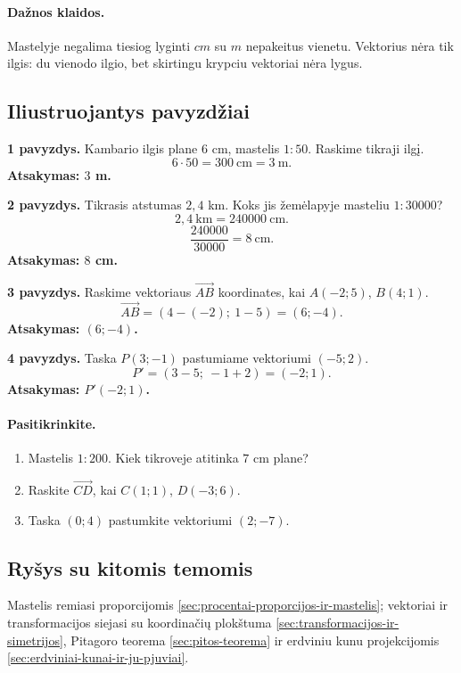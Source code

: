 \paragraph{Dažnos klaidos.}
Mastelyje negalima tiesiog lyginti $cm$ su $m$ nepakeitus vienetu. Vektorius nėra tik ilgis: du vienodo ilgio, bet skirtingu krypciu vektoriai nėra lygus.

\subsection{Iliustruojantys pavyzdžiai}
\textbf{1 pavyzdys.} Kambario ilgis plane $6$ cm, mastelis $1:50$. Raskime tikraji ilgį.
\[
6\cdot50=300\ \text{cm}=3\ \text{m}.
\]
\textbf{Atsakymas: $3$ m.}

\textbf{2 pavyzdys.} Tikrasis atstumas $2{,}4$ km. Koks jis žemėlapyje masteliu $1:30000$?
\[
2{,}4\ \text{km}=240000\ \text{cm}.
\]
\[
\frac{240000}{30000}=8\ \text{cm}.
\]
\textbf{Atsakymas: $8$ cm.}

\textbf{3 pavyzdys.} Raskime vektoriaus $\overrightarrow{AB}$ koordinates, kai $A(-2;5)$, $B(4;1)$.
\[
\overrightarrow{AB}=(4-(-2);\ 1-5)=(6;-4).
\]
\textbf{Atsakymas: $(6;-4)$.}

\textbf{4 pavyzdys.} Taska $P(3;-1)$ pastumiame vektoriumi $(-5;2)$.
\[
P'=(3-5;\ -1+2)=(-2;1).
\]
\textbf{Atsakymas: $P'(-2;1)$.}

\paragraph{Pasitikrinkite.}
\begin{enumerate}[label=\alph*)]
\item Mastelis $1:200$. Kiek tikroveje atitinka $7$ cm plane?
\item Raskite $\overrightarrow{CD}$, kai $C(1;1)$, $D(-3;6)$.
\item Taska $(0;4)$ pastumkite vektoriumi $(2;-7)$.
\end{enumerate}

\subsection{Ryšys su kitomis temomis}
Mastelis remiasi proporcijomis \ref{sec:procentai-proporcijos-ir-mastelis}; vektoriai ir transformacijos siejasi su koordinačių plokštuma \ref{sec:transformacijos-ir-simetrijos}, Pitagoro teorema \ref{sec:pitos-teorema} ir erdviniu kunu projekcijomis \ref{sec:erdviniai-kunai-ir-ju-pjuviai}.

